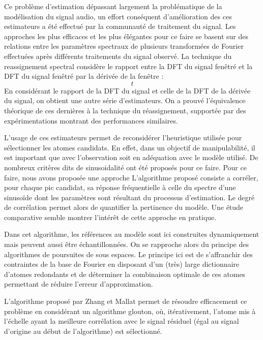 
Ce problème d'estimation dépassant largement la problématique de la modélisation du signal audio, un effort conséquent d'amélioration des ces estimateurs a été effectué par la communauté de traitement du signal. Les approches les plus efficaces et les plus élégantes pour ce faire se basent sur des relations entre les paramètres spectraux de plusieurs transformées de Fourier effectuées après différents traitements du signal observé. La technique du reassignement spectral\cite{auger1995improving} considère le rapport entre la DFT du signal fenêtré et la DFT du signal fenêtré par la dérivée de la fenêtre :
\begin{equation}
t
\end{equation}
En considérant le rapport de la DFT du signal et celle de la DFT de la dérivée du signal, on obtient une autre série d'estimateurs. On a prouvé l'équivalence théorique de ces dernières à la technique du réassignement, supportée par des expérimentations montrant des performances similaires\cite{lagrangeJaes07}.

L'usage de ces estimateurs permet de reconsidérer l'heuristique utilisée pour sélectionner les atomes candidats. En effet, dans un objectif de manipulabilité, il est important que  avec l'observation  soit en adéquation avec le modèle utilisé. De nombreux critères dits de \og sinusoidalité \fg ont été proposés pour ce faire. Pour ce faire, nous avons proposée une approche\cite{peak-selection} L'algorithme proposé consiste a corréler, pour chaque pic candidat, sa réponse fréquentielle à celle du spectre d'une sinusoïde dont les paramètres sont résultant du processus d'estimation. Le degré de corrélation permet alors de quantifier la pertinence du modèle.
Une étude comparative\cite{wells2010comparative} semble montrer l'intérêt de cette approche en pratique.

Dans cet algorithme, les références au modèle sont ici construites dynamiquement mais peuvent aussi être échantillonnées. On se rapproche alors du principe des algorithmes de poursuites de sous espaces\cite{}. Le principe ici est de s'affranchir des contraintes de la base de Fourier en disposant d'un (très) large dictionnaire d'atomes redondants et de déterminer la combinaison optimale de ces atomes permettant de réduire l'erreur d'approximation.

L'algorithme proposé par Zhang et Mallat\cite{mallat1993matching} permet de résoudre efficacement ce problème en considérant un algorithme glouton, où, itérativement, l'atome mis à l'échelle ayant la meilleure corrélation avec le signal résiduel (égal au signal d'origine au début de l'algorithme) est sélectionné.

